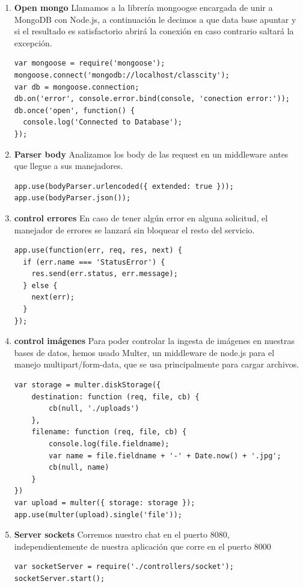 \begin{enumerate}
    \item \textbf{Open mongo} Llamamos a la librería mongoogse encargada de unir a MongoDB con Node.js, a continuación le decimos a que data base apuntar y si el resultado es satisfactorio abrirá la conexión en caso contrario saltará la excepción.
\begin{lstlisting}
var mongoose = require('mongoose');
mongoose.connect('mongodb://localhost/classcity');
var db = mongoose.connection;
db.on('error', console.error.bind(console, 'conection error:'));
db.once('open', function() {
  console.log('Connected to Database');
});
\end{lstlisting}
    \item \textbf{Parser body} Analizamos los body de las request en un middleware antes que llegue a sus manejadores. 
\begin{lstlisting}    
app.use(bodyParser.urlencoded({ extended: true }));
app.use(bodyParser.json());
\end{lstlisting}
    \item \textbf{control errores} En caso de tener algún error en alguna solicitud, el manejador de errores se lanzará sin bloquear el resto del servicio.
\begin{lstlisting}    
app.use(function(err, req, res, next) {
  if (err.name === 'StatusError') {
    res.send(err.status, err.message);
  } else {
    next(err);
  }
});
\end{lstlisting}
    \item \textbf{control imágenes} Para poder controlar la ingesta de imágenes en nuestras bases de datos, hemos usado Multer, un middleware de node.js para el manejo multipart/form-data, que se usa principalmente para cargar archivos. 
    \begin{lstlisting}
var storage = multer.diskStorage({
    destination: function (req, file, cb) {
        cb(null, './uploads')
    },
    filename: function (req, file, cb) {
        console.log(file.fieldname);
        var name = file.fieldname + '-' + Date.now() + '.jpg';
        cb(null, name)
    }
})
var upload = multer({ storage: storage });
app.use(multer(upload).single('file'));
    \end{lstlisting}
    \item \textbf{Server sockets} Corremos nuestro chat en el puerto 8080, independientemente de nuestra aplicación que corre en el puerto 8000
    
\begin{lstlisting}
var socketServer = require('./controllers/socket');
socketServer.start();
\end{lstlisting}


\end{enumerate}
